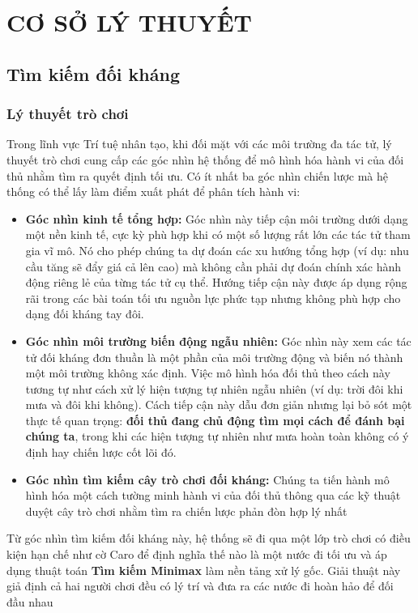 
\chapter{CƠ SỞ LÝ THUYẾT}
\label{Chapter2}

\section{Tìm kiếm đối kháng}
\subsection{Lý thuyết trò chơi}

Trong lĩnh vực Trí tuệ nhân tạo, khi đối mặt với các môi trường đa tác tử, lý thuyết trò chơi cung cấp các góc nhìn hệ thống để mô hình hóa hành vi của đối thủ nhằm tìm ra quyết định tối ưu. Có ít nhất ba góc nhìn chiến lược mà hệ thống có thể lấy làm điểm xuất phát để phân tích hành vi:

\begin{itemize}
	\item \textbf{Góc nhìn kinh tế tổng hợp:} Góc nhìn này tiếp cận môi trường dưới dạng một nền kinh tế, cực kỳ phù hợp khi có một số lượng rất lớn các tác tử tham gia vĩ mô. Nó cho phép chúng ta dự đoán các xu hướng tổng hợp (ví dụ: nhu cầu tăng sẽ đẩy giá cả lên cao) mà không cần phải dự đoán chính xác hành động riêng lẻ của từng tác tử cụ thể. Hướng tiếp cận này được áp dụng rộng rãi trong các bài toán tối ưu nguồn lực phức tạp nhưng không phù hợp cho dạng đối kháng tay đôi.
	\item \textbf{Góc nhìn môi trường biến động ngẫu nhiên:} Góc nhìn này xem các tác tử đối kháng đơn thuần là một phần của môi trường động và biến nó thành một môi trường không xác định. Việc mô hình hóa đối thủ theo cách này tương tự như cách xử lý hiện tượng tự nhiên ngẫu nhiên (ví dụ: trời đôi khi mưa và đôi khi không). Cách tiếp cận này dẫu đơn giản nhưng lại bỏ sót một thực tế quan trọng: \textbf{đối thủ đang chủ động tìm mọi cách để đánh bại chúng ta}, trong khi các hiện tượng tự nhiên như mưa hoàn toàn không có ý định hay chiến lược cốt lõi đó.
	\item \textbf{Góc nhìn tìm kiếm cây trò chơi đối kháng:} Chúng ta tiến hành mô hình hóa một cách tường minh hành vi của đối thủ thông qua các kỹ thuật duyệt cây trò chơi nhằm tìm ra chiến lược phản đòn hợp lý nhất
\end{itemize}
Từ góc nhìn tìm kiếm đối kháng này, hệ thống sẽ đi qua một lớp trò chơi có điều kiện hạn chế như cờ Caro để định nghĩa thế nào là một nước đi tối ưu và áp dụng thuật toán \textbf{Tìm kiếm Minimax} làm nền tảng xử lý gốc. Giải thuật này giả định cả hai người chơi đều có lý trí và đưa ra các nước đi hoàn hảo để đối đầu nhau 

